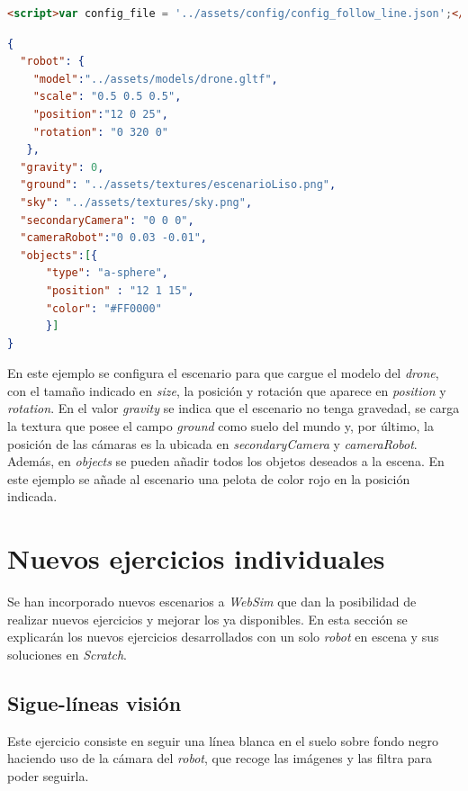 \begin{lstlisting}[language=html,caption=variable en \textit{HTML} para indicar la ruta del fichero de configuración,label={list:variable}]
    <script>var config_file = '../assets/config/config_follow_line.json';</script>
\end{lstlisting}

\begin{lstlisting}[language=json]
  {
  "robot": {
    "model":"../assets/models/drone.gltf",
    "scale": "0.5 0.5 0.5",
    "position":"12 0 25",
    "rotation": "0 320 0"
   },
  "gravity": 0,
  "ground": "../assets/textures/escenarioLiso.png",
  "sky": "../assets/textures/sky.png",
  "secondaryCamera": "0 0 0",
  "cameraRobot":"0 0.03 -0.01",
  "objects":[{
      "type": "a-sphere",
      "position" : "12 1 15",
      "color": "#FF0000"
      }]
}
\end{lstlisting}

En este ejemplo se configura el escenario para que cargue el modelo del \textit{drone}, con el tamaño indicado en \textit{size}, la posición y rotación que aparece en \textit{position} y \textit{rotation}. En el valor \textit{gravity} se indica que el escenario no tenga gravedad, se carga la textura que posee el campo \textit{ground} como suelo del mundo y, por último, la posición de las cámaras es la ubicada en \textit{secondaryCamera} y \textit{cameraRobot}. Además, en \textit{objects} se pueden añadir todos los objetos deseados a la escena. En este ejemplo se añade al escenario una pelota de color rojo en la posición indicada.


\section{Nuevos ejercicios individuales}
\label{sec:escenarios}

Se han incorporado nuevos escenarios a \textit{WebSim} que dan la posibilidad de realizar nuevos ejercicios y mejorar los ya disponibles. En esta sección se explicarán los nuevos ejercicios desarrollados con un solo \textit{robot} en escena y sus soluciones en \textit{Scratch}.

\subsection{Sigue-líneas visión}
    Este ejercicio consiste en seguir una línea blanca en el suelo sobre fondo negro haciendo uso de la cámara del \textit{robot}, que recoge las imágenes y las filtra para poder seguirla.
    
